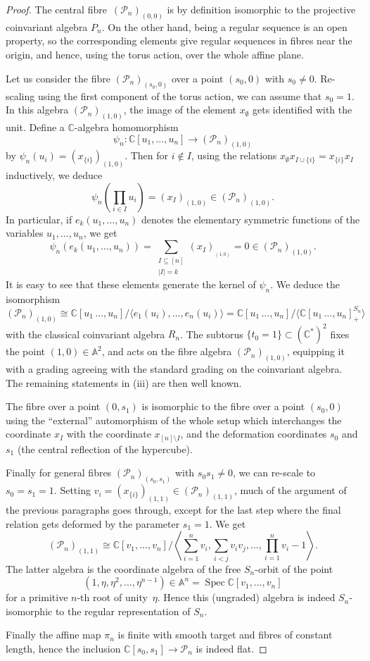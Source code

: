 \documentclass[10pt,a4paper]{amsart}
\newcommand{\A}{\mathbb{A}}
\newcommand{\C}{\mathbb{C}}
\newcommand{\CP}{\mathscr{P}}
\DeclareMathOperator{\Spec}{Spec}
\begin{document}
\begin{proof}

The central fibre~$(\CP_n)_{(0,0)}$ is by definition isomorphic to the projective coinvariant algebra $P_n$. On the other hand, being a regular sequence is an open property, so the corresponding elements give regular sequences in fibres near the origin, and hence, using the torus action, over the whole affine plane. 

Let us consider the fibre $(\CP_n)_{(s_0,0)}$ over a point $(s_0, 0)$ with $s_0\neq 0$. Re-scaling using the first component of the torus action, we can assume that $s_0=1$. In this algebra $(\CP_n)_{(1,0)}$, the image of the element $x_{\scriptscriptstyle \emptyset}$ gets identified with the unit. Define a $\C$-algebra homomorphism 
\[\psi_n\colon \C[u_1, \ldots, u_n]\to (\CP_n)_{(1,0)}\]
by $\psi_n(u_i)=(x_{\scriptscriptstyle\{i\}})_{(1,0)}$. Then for $i\not\in I$, using the relations $x_{\scriptscriptstyle\emptyset} x_{\scriptscriptstyle I\cup \{i\}} = x_{\scriptscriptstyle\{i\}} x_{\scriptscriptstyle I}$ inductively, we deduce 
\[\psi_n\left(\prod_{i\in I} u_i\right) = (x_{\scriptscriptstyle I})_{(1,0)}  \in (\CP_n)_{(1,0)}.\]
In particular, if $e_k(u_1,\ldots, u_n)$ denotes the elementary symmetric functions of the variables $u_1, \ldots, u_n$, we get
\[\psi_n\left(e_k(u_1,\ldots, u_n)\right) = \sum_{\substack{I\subseteq[n]\\|I|=k}} (x_{\scriptscriptstyle I})_{_{(1,0)}} =  0\in (\CP_n)_{(1,0)}.\]
It is easy to see that these elements generate the kernel of $\psi_n$. We deduce the isomorphism 
\[ (\CP_n)_{(1,0)} \cong  \C[u_1\,\ldots, u_n]/\langle e_1(u_i), \ldots, e_n(u_i)\rangle = \C[u_1\,\ldots, u_n]/\langle \C[u_1\,\ldots, u_n]^{S_n}_+\rangle
\]
with the classical coinvariant algebra $R_n$. 
The subtorus $\{t_0=1\}\subset (\C^*)^2$ fixes the point $(1,0)\in\A^2$, and acts on the fibre algebra $(\CP_n)_{(1,0)}$, equipping it  with a grading agreeing with the standard grading on the coinvariant algebra. The remaining statements in (iii) are then well known. 

The fibre over a point $(0, s_1)$ is isomorphic to the fibre over a point $(s_0, 0)$ using the ``external'' automorphism of the whole setup which interchanges the coordinate $x_{\scriptscriptstyle I}$ with the coordinate $x_{\scriptscriptstyle [n]\setminus I}$, and the deformation coordinates $s_0$ and $s_1$ (the central reflection of the hypercube). 

Finally for general fibres $(\CP_n)_{(s_0,s_1)}$ with $s_0s_1\neq 0$, we can re-scale to $s_0=s_1=1$. Setting $v_i=(x_{\{i\}})_{(1,1)}\in(\CP_n)_{(1,1)}$, much of the argument of the previous paragraphs goes through, except for the last step where the final relation gets deformed by the parameter $s_1=1$. We get
\[ (\CP_n)_{(1,1)}\cong\C[v_1, \ldots, v_n]\Big/\left\langle \sum_{i=1}^n v_i, \sum_{i<j} v_iv_j, \ldots, \prod_{i=1}^n v_i -1\right\rangle. \]
The latter algebra is the coordinate algebra of the free $S_n$-orbit of the point 
\[(1, \eta, \eta^2, \ldots, \eta^{n-1})\in\A^n = \Spec\C[v_1, \ldots, v_n]\]
for a primitive $n$-th root of unity~$\eta$. Hence this (ungraded) algebra is indeed $S_n$-isomorphic to the regular representation of $S_n$.  

Finally the affine map $\pi_n$ is finite with smooth target and fibres of constant length, hence the inclusion $\C[s_0, s_1]\rightarrow \CP_n$ is indeed flat. 
\end{proof}
\end{document}
